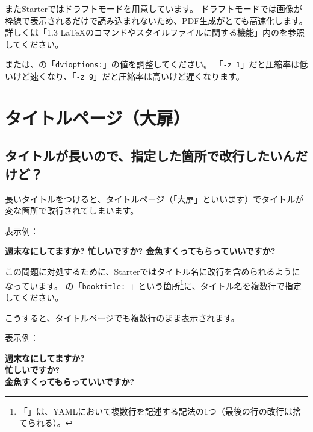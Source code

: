 またStarterではドラフトモードを用意しています。
ドラフトモードでは画像が枠線で表示されるだけで読み込まれないため、PDF生成がとても高速化します。
詳しくは「1.3 \LaTeX{}のコマンドやスタイルファイルに関する機能」内のを参照してください。

または、の「\texttt{dvioptions:}」の値を調整してください。
「\texttt{{-}z 1}」だと圧縮率は低いけど速くなり、「\texttt{{-}z 9}」だと圧縮率は高いけど遅くなります。

\section{タイトルページ（大扉）}
\label{sec:2-6}

\subsection*{タイトルが長いので、指定した箇所で改行したいんだけど？}
\label{sec:2-6-1}

長いタイトルをつけると、タイトルページ（「大扉」といいます）でタイトルが変な箇所で改行されてしまいます。

表示例：

\begin{center}
  \gtfamily\sffamily\bfseries\ebseries\Huge
  週末なにしてますか?
  忙しいですか?
  金魚すくってもらっていいですか?
\end{center}
\bigskip

この問題に対処するために、Starterではタイトル名に改行を含められるようになっています。
の「\texttt{booktitle: \textbar{}{-}}」という箇所\footnote{「\texttt{\textbar{}{-}}」は、YAMLにおいて複数行を記述する記法の1つ（最後の行の改行は捨てられる）。}に、タイトル名を複数行で指定してください。

\label{}
\begin{starterprogram}\end{starterprogram}

こうすると、タイトルページでも複数行のまま表示されます。

表示例：

\begin{center}
  \gtfamily\sffamily\bfseries\ebseries\Huge
  週末なにしてますか?\\
  忙しいですか?\\
  金魚すくってもらっていいですか?\par
\end{center}
\bigskip

